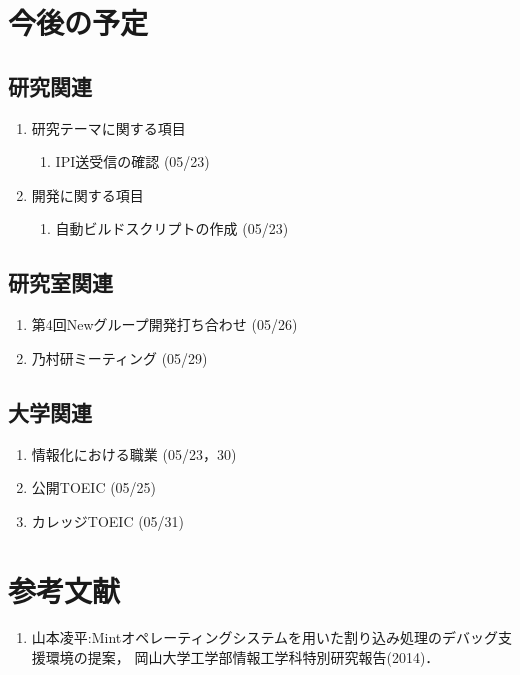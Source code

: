 \documentclass[fleqn, 14pt]{extarticle}
\begin{document}
\section{今後の予定}
\label{sec-4}
\subsection{研究関連}
\label{sec-4-1}

\begin{enumerate}
\item 研究テーマに関する項目
\hfill
\begin{enumerate}

\item IPI送受信の確認
\hfill
(05/23)

\end{enumerate}
\item 開発に関する項目
\hfill
\begin{enumerate}

\item 自動ビルドスクリプトの作成
\hfill
(05/23)

\end{enumerate}
\end{enumerate}

\subsection{研究室関連}
\label{sec-4-2}

\begin{enumerate}
\item 第4回Newグループ開発打ち合わせ
\hfill
\label{enum-3}
(05/26)
\item 乃村研ミーティング
\hfill
\label{enum-4}
(05/29)
\end{enumerate}
\subsection{大学関連}
\begin{enumerate}
\item 情報化における職業
\hfill
\label{enum-5}
(05/23，30)
\item 公開TOEIC
\hfill
\label{enum-6}
(05/25)
\item カレッジTOEIC
\hfill
\label{enum-7}
(05/31)
\end{enumerate}

\section{参考文献}
\renewcommand{\labelenumi}{[\arabic{enumi}]}
\begin{enumerate}
\item 山本凌平:Mintオペレーティングシステムを用いた割り込み処理のデバッグ支援環境の提案，
岡山大学工学部情報工学科特別研究報告(2014)．
\end{enumerate}
\end{document}
